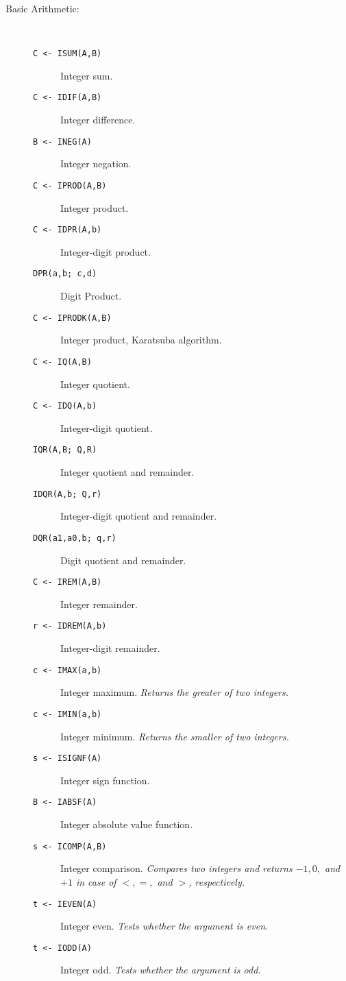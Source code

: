 \begin{description}
\item[Basic Arithmetic:] \ \
  \begin{description}
  \item[{\tt C <- ISUM(A,B) 
}]  Integer sum.
  \item[{\tt C <- IDIF(A,B) 
}]  Integer difference.
  \item[{\tt B <- INEG(A) 
}]  Integer negation.
  \item[{\tt C <- IPROD(A,B) 
}]  Integer product.
  \item[{\tt C <- IDPR(A,b) 
}]  Integer-digit product.
  \item[{\tt  DPR(a,b; c,d) 
}]  Digit Product.
  \item[{\tt C <- IPRODK(A,B) 
}]  Integer product, Karatsuba algorithm.
  \item[{\tt C <- IQ(A,B) 
}]  Integer quotient.
  \item[{\tt C <- IDQ(A,b) 
}]  Integer-digit quotient.
  \item[{\tt  IQR(A,B; Q,R) 
}]  Integer quotient and remainder.
  \item[{\tt  IDQR(A,b; Q,r) 
}]  Integer-digit quotient and remainder.
  \item[{\tt  DQR(a1,a0,b; q,r) 
}]  Digit quotient and remainder.
  \item[{\tt C <- IREM(A,B) 
}]  Integer remainder.
  \item[{\tt r <- IDREM(A,b) 
}]  Integer-digit remainder.
  \item[{\tt c <- IMAX(a,b) 
}]  Integer maximum. {\em Returns the greater of two integers.}
  \item[{\tt c <- IMIN(a,b) 
}]  Integer minimum. {\em Returns the smaller of two integers.}
  \item[{\tt s <- ISIGNF(A) 
}]  Integer sign function.
  \item[{\tt B <- IABSF(A) 
}]  Integer absolute value function.
  \item[{\tt s <- ICOMP(A,B) 
}]  Integer comparison. {\em Compares two integers and returns
    $-1, 0,$ and $+1$ in case of $<, =,$ and $>$, respectively.}
  \item[{\tt t <- IEVEN(A) 
}]  Integer even. {\em Tests whether the argument is even.}
  \item[{\tt t <- IODD(A) 
}]  Integer odd. {\em Tests whether the argument is odd.}
  \end{description}


\end{description}
